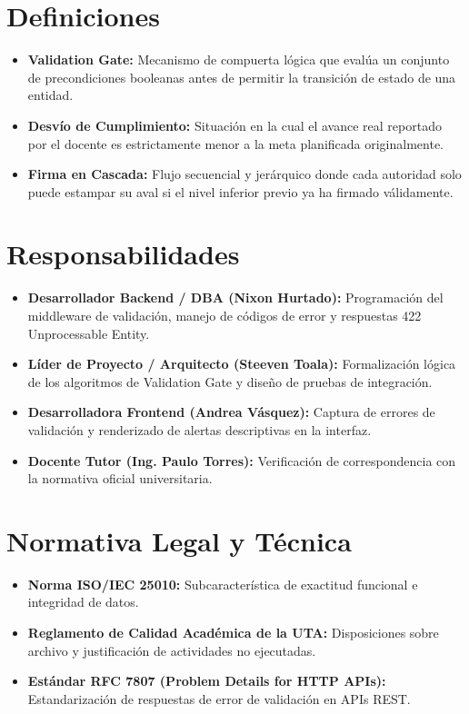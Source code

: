 \documentclass[12pt,a4paper]{article}
\begin{document}
\section{Definiciones}
\begin{itemize}[leftmargin=1.5em, itemsep=2pt]
    \item \textbf{Validation Gate:} Mecanismo de compuerta lógica que evalúa un conjunto de precondiciones booleanas antes de permitir la transición de estado de una entidad.
    \item \textbf{Desvío de Cumplimiento:} Situación en la cual el avance real reportado por el docente es estrictamente menor a la meta planificada originalmente.
    \item \textbf{Firma en Cascada:} Flujo secuencial y jerárquico donde cada autoridad solo puede estampar su aval si el nivel inferior previo ya ha firmado válidamente.
\end{itemize}

\section{Responsabilidades}
\begin{itemize}[leftmargin=1.5em, itemsep=2pt]
    \item \textbf{Desarrollador Backend / DBA (Nixon Hurtado):} Programación del middleware de validación, manejo de códigos de error y respuestas 422 Unprocessable Entity.
    \item \textbf{Líder de Proyecto / Arquitecto (Steeven Toala):} Formalización lógica de los algoritmos de Validation Gate y diseño de pruebas de integración.
    \item \textbf{Desarrolladora Frontend (Andrea Vásquez):} Captura de errores de validación y renderizado de alertas descriptivas en la interfaz.
    \item \textbf{Docente Tutor (Ing. Paulo Torres):} Verificación de correspondencia con la normativa oficial universitaria.
\end{itemize}

\section{Normativa Legal y Técnica}
\begin{itemize}[leftmargin=1.5em, itemsep=1.5pt]
    \item \textbf{Norma ISO/IEC 25010:} Subcaracterística de exactitud funcional e integridad de datos.
    \item \textbf{Reglamento de Calidad Académica de la UTA:} Disposiciones sobre archivo y justificación de actividades no ejecutadas.
    \item \textbf{Estándar RFC 7807 (Problem Details for HTTP APIs):} Estandarización de respuestas de error de validación en APIs REST.
\end{itemize}
\end{document}
